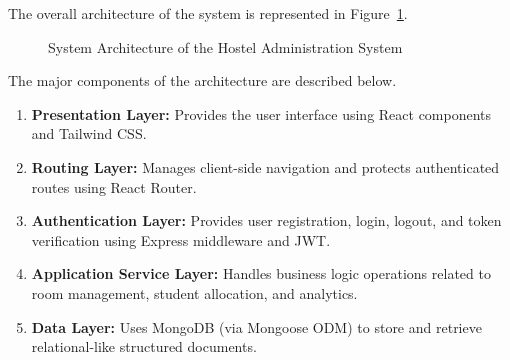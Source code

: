 The overall architecture of the system is represented in Figure~\ref{fig:systemarchitecture}.

\begin{figure}[H]
    \centering
    \caption{System Architecture of the Hostel Administration System}
    \label{fig:systemarchitecture}
\end{figure}

The major components of the architecture are described below.

\begin{enumerate}
    \item \textbf{Presentation Layer:} Provides the user interface using React components and Tailwind CSS.
    
    \item \textbf{Routing Layer:} Manages client-side navigation and protects authenticated routes using React Router.
    
    \item \textbf{Authentication Layer:} Provides user registration, login, logout, and token verification using Express middleware and JWT.
    
    \item \textbf{Application Service Layer:} Handles business logic operations related to room management, student allocation, and analytics.
    
    \item \textbf{Data Layer:} Uses MongoDB (via Mongoose ODM) to store and retrieve relational-like structured documents.
\end{enumerate}

